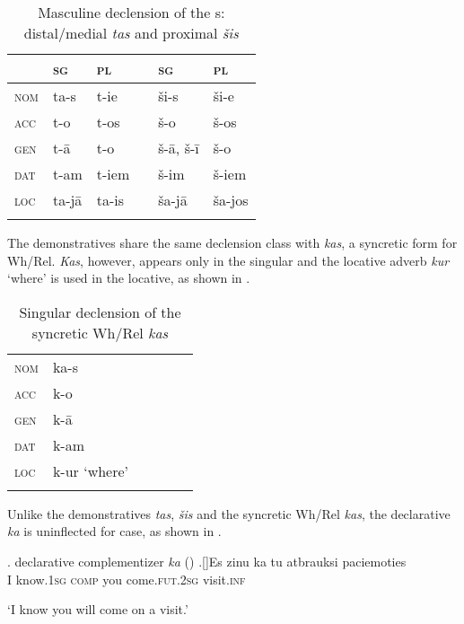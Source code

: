 \begin{table}
\caption{Masculine declension of the  s: distal/medial \textit{tas} and proximal \textit{\v{s}is}}
\label{Lat:cases} 
\begin{tabular}[th]{ l l l l l l }
\lsptoprule	
 			&  \textsc{sg}	& \textsc{pl} & & \textsc{sg} & \textsc{pl}\\\hline	
\textsc{nom} 	&	ta-s					& t-ie 	& & \v{s}i-s	& \v{s}i-e\\
\textsc{acc} 	& 	t-o					& t-os 	& & \v{s}-o 	& \v{s}-os\\
\textsc{gen} 	&	t-\={a}	& t-o 	& & \v{s}-\={a}, \v{s}-\={i} & \v{s}-o\\
\textsc{dat} 	&	t-am					& t-iem 	& & \v{s}-im	& \v{s}-iem\\
\textsc{loc} 	&	ta-j\={a} & ta-is 	& & \v{s}a-j\={a} & \v{s}a-jos\\
\lspbottomrule	
\end{tabular}
\end{table}

The demonstratives share the same declension class with \textit{kas}, a syncretic form for Wh/Rel. \textit{Kas}, however, appears only in the singular and the locative adverb \textit{kur} `where' is used in the locative, as shown in .

\begin{table}
\caption{Singular declension of the  syncretic Wh/Rel \textit{kas}}
\label{kas:cases} 
\begin{tabular}[t]{ l l l l l l }
\lsptoprule	
\textsc{nom} 	&	ka-s\\
\textsc{acc} 	& 	k-o\\
\textsc{gen} 	&	k-\={a}\\
\textsc{dat} 	&	k-am\\
\textsc{loc}	&	k-ur `where'\\
\lspbottomrule
\end{tabular}
\end{table}
 
\par Unlike the demonstratives \textit{tas}, \textit{\v{s}is} and the syncretic Wh/Rel  \mbox{\textit{kas}}, the  declarative  \textit{ka} is uninflected for case, as shown in \Next.

\ex.  declarative complementizer \textit{ka}\label{ex:ka} (\citealt[229]{Holvoet2016})
\ag.[]\hspace{-22pt}Es zinu  ka tu atbrauksi paciemoties \\
\hspace{-22pt}I know.\textsc{1sg}   \textsc{comp} you come.\textsc{fut.2sg} visit.\textsc{inf}\\
\hspace{-22pt}\strut `I know you will come on a visit.'
 
